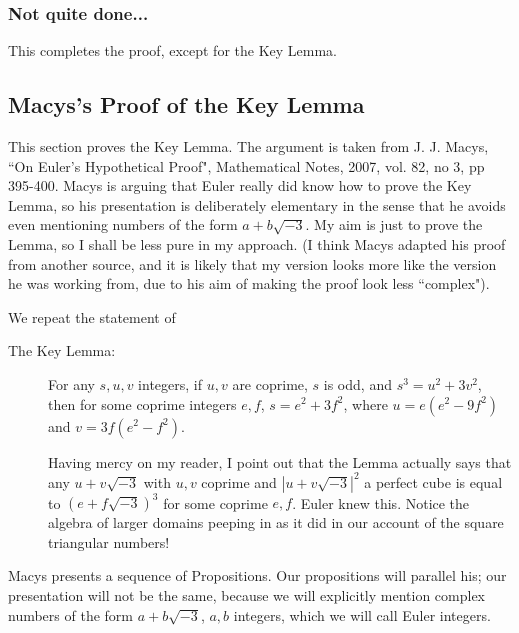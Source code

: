 \documentclass[12pt]{article}
\begin{document}
\subsubsection{Not quite done...}
This completes the proof, except for the Key Lemma.

\subsection{Macys's Proof of the Key Lemma}

This section proves the Key Lemma.  The argument is taken from J. J. Macys, ``On Euler's Hypothetical Proof", Mathematical Notes, 2007, vol. 82, no 3, pp 395-400.  Macys is arguing that Euler really did know how to prove the Key Lemma, so his presentation is deliberately elementary in the sense that he avoids even mentioning numbers of the form $a+b\sqrt{-3}$.  My aim is just to prove the Lemma, so I shall be less pure in my approach.  (I think Macys adapted his proof from another source, and it is likely that my version looks more like the version he was working from, due to his aim of making the proof look less ``complex").

We repeat the statement of

\begin{description}

\item[The Key Lemma:]  For any $s,u,v$ integers, if $u,v$ are coprime, $s$ is odd,  and $s^3=u^2+3v^2$, then for some coprime integers $e,f$,
$s=e^2+3f^2$,  where $u=e(e^2-9f^2)$ and $v=3f(e^2-f^2)$.

Having mercy on my reader, I point out that the Lemma actually says that any $u+v\sqrt{-3}$ with $u,v$ coprime and $|u+v\sqrt{-3}|^2$ a perfect cube
is equal to $(e+f\sqrt{-3})^3$ for some coprime $e,f$.  Euler knew this.  Notice the algebra of larger domains peeping in as it did in our account of the square triangular numbers!

\end{description}

Macys presents a sequence of Propositions.  Our propositions will parallel his; our presentation will not be the same, because we will explicitly mention complex numbers of the form $a+b\sqrt{-3}$, $a,b$ integers, which we will call Euler integers.
\end{document}
